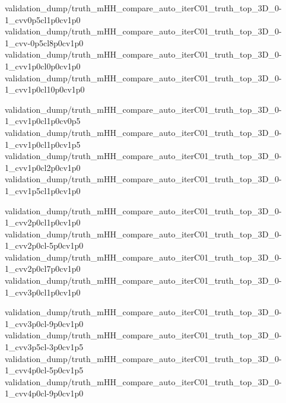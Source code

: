{validation_dump/truth_mHH_compare_auto_iterC01_truth_top_3D_0-1_cvv0p5cl1p0cv1p0}
{validation_dump/truth_mHH_compare_auto_iterC01_truth_top_3D_0-1_cvv-0p5cl8p0cv1p0}
{validation_dump/truth_mHH_compare_auto_iterC01_truth_top_3D_0-1_cvv1p0cl0p0cv1p0}
{validation_dump/truth_mHH_compare_auto_iterC01_truth_top_3D_0-1_cvv1p0cl10p0cv1p0}

{validation_dump/truth_mHH_compare_auto_iterC01_truth_top_3D_0-1_cvv1p0cl1p0cv0p5}
{validation_dump/truth_mHH_compare_auto_iterC01_truth_top_3D_0-1_cvv1p0cl1p0cv1p5}
{validation_dump/truth_mHH_compare_auto_iterC01_truth_top_3D_0-1_cvv1p0cl2p0cv1p0}
{validation_dump/truth_mHH_compare_auto_iterC01_truth_top_3D_0-1_cvv1p5cl1p0cv1p0}

{validation_dump/truth_mHH_compare_auto_iterC01_truth_top_3D_0-1_cvv2p0cl1p0cv1p0}
{validation_dump/truth_mHH_compare_auto_iterC01_truth_top_3D_0-1_cvv2p0cl-5p0cv1p0}
{validation_dump/truth_mHH_compare_auto_iterC01_truth_top_3D_0-1_cvv2p0cl7p0cv1p0}
{validation_dump/truth_mHH_compare_auto_iterC01_truth_top_3D_0-1_cvv3p0cl1p0cv1p0}

{validation_dump/truth_mHH_compare_auto_iterC01_truth_top_3D_0-1_cvv3p0cl-9p0cv1p0}
{validation_dump/truth_mHH_compare_auto_iterC01_truth_top_3D_0-1_cvv3p5cl-3p0cv1p5}
{validation_dump/truth_mHH_compare_auto_iterC01_truth_top_3D_0-1_cvv4p0cl-5p0cv1p5}
{validation_dump/truth_mHH_compare_auto_iterC01_truth_top_3D_0-1_cvv4p0cl-9p0cv1p0}
